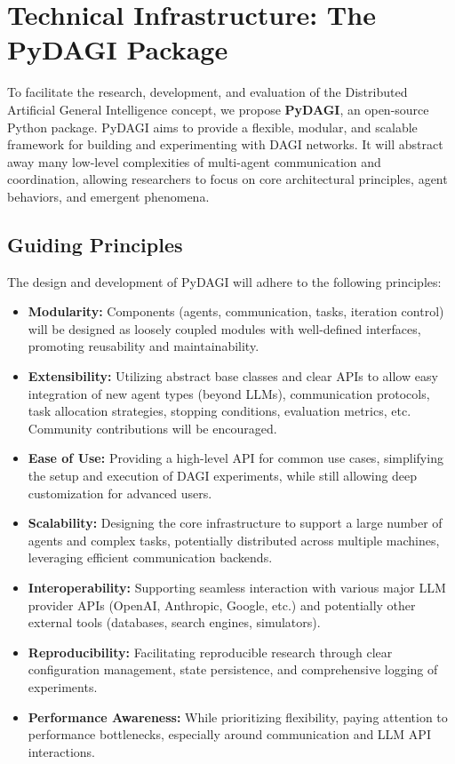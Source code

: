 \documentclass[12pt]{amsart}
\begin{document}
\section{Technical Infrastructure: The PyDAGI Package}
\label{sec:technical_infrastructure}
To facilitate the research, development, and evaluation of the Distributed Artificial General Intelligence concept, we propose \textbf{PyDAGI}, an open-source Python package. PyDAGI aims to provide a flexible, modular, and scalable framework for building and experimenting with DAGI networks. It will abstract away many low-level complexities of multi-agent communication and coordination, allowing researchers to focus on core architectural principles, agent behaviors, and emergent phenomena.

\subsection{Guiding Principles}
The design and development of PyDAGI will adhere to the following principles:
\begin{itemize}[leftmargin=*]
    \item \textbf{Modularity:} Components (agents, communication, tasks, iteration control) will be designed as loosely coupled modules with well-defined interfaces, promoting reusability and maintainability.
    \item \textbf{Extensibility:} Utilizing abstract base classes and clear APIs to allow easy integration of new agent types (beyond LLMs), communication protocols, task allocation strategies, stopping conditions, evaluation metrics, etc. Community contributions will be encouraged.
    \item \textbf{Ease of Use:} Providing a high-level API for common use cases, simplifying the setup and execution of DAGI experiments, while still allowing deep customization for advanced users.
    \item \textbf{Scalability:} Designing the core infrastructure to support a large number of agents and complex tasks, potentially distributed across multiple machines, leveraging efficient communication backends.
    \item \textbf{Interoperability:} Supporting seamless interaction with various major LLM provider APIs (OpenAI, Anthropic, Google, etc.) and potentially other external tools (databases, search engines, simulators).
    \item \textbf{Reproducibility:} Facilitating reproducible research through clear configuration management, state persistence, and comprehensive logging of experiments.
    \item \textbf{Performance Awareness:} While prioritizing flexibility, paying attention to performance bottlenecks, especially around communication and LLM API interactions.
\end{itemize}
\end{document}

